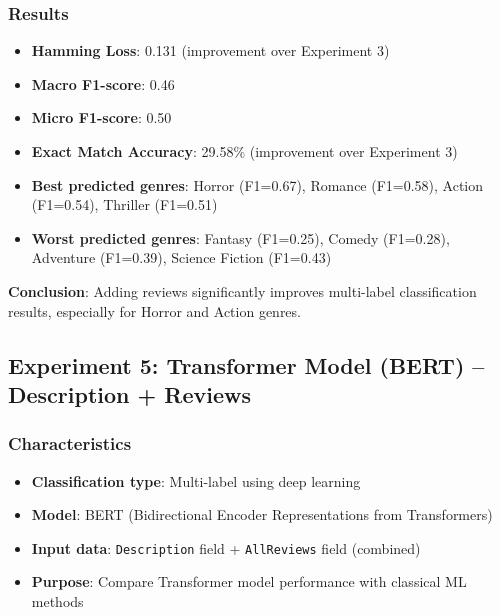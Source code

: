 \documentclass[12pt,a4paper]{article}
\begin{document}
\subsubsection{Results}
\begin{itemize}
    \item \textbf{Hamming Loss}: 0.131 (improvement over Experiment 3)
    \item \textbf{Macro F1-score}: 0.46
    \item \textbf{Micro F1-score}: 0.50
    \item \textbf{Exact Match Accuracy}: 29.58\% (improvement over Experiment 3)
    \item \textbf{Best predicted genres}: Horror (F1=0.67), Romance (F1=0.58), Action (F1=0.54), Thriller (F1=0.51)
    \item \textbf{Worst predicted genres}: Fantasy (F1=0.25), Comedy (F1=0.28), Adventure (F1=0.39), Science Fiction (F1=0.43)
\end{itemize}

\textbf{Conclusion}: Adding reviews significantly improves multi-label classification results, especially for Horror and Action genres.

\subsection{Experiment 5: Transformer Model (BERT) -- Description + Reviews}

\subsubsection{Characteristics}
\begin{itemize}
    \item \textbf{Classification type}: Multi-label using deep learning
    \item \textbf{Model}: BERT (Bidirectional Encoder Representations from Transformers)
    \item \textbf{Input data}: \texttt{Description} field + \texttt{AllReviews} field (combined)
    \item \textbf{Purpose}: Compare Transformer model performance with classical ML methods
\end{itemize}
\end{document}
